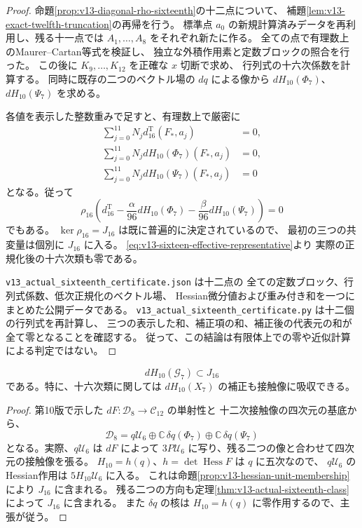 \begin{proof}
命題\ref{prop:v13-diagonal-rho-sixteenth}の十二点について、
補題\ref{lem:v13-exact-twelfth-truncation}の再帰を行う。
標準点 $a_0$ の新規計算済みデータを再利用し、残る十一点では
$A_1,\ldots,A_8$ をそれぞれ新たに作る。
全ての点で有理数上のMaurer--Cartan等式を検証し、
独立な外積作用素と定数ブロックの照合を行った。
この後に $K_9,\ldots,K_{12}$ を正確な $x$ 切断で求め、
行列式の十六次係数を計算する。
同時に既存の二つのベクトル場の $dq$ による像から
$dH_{10}(\Phi_7)$、$dH_{10}(\Psi_7)$ を求める。

各値を表示した整数重みで足すと、有理数上で厳密に
\begin{align*}
 \sum_{j=0}^{11}N_jd^{\mathrm T}_{16}(F_*,a_j)&=0,\\
 \sum_{j=0}^{11}N_jdH_{10}(\Phi_7)(F_*,a_j)&=0,\\
 \sum_{j=0}^{11}N_jdH_{10}(\Psi_7)(F_*,a_j)&=0
\end{align*}
となる。従って
\[
 \rho_{16}\left(
 d^{\mathrm T}_{16}-\frac{\alpha}{96}dH_{10}(\Phi_7)
                   -\frac{\beta}{96}dH_{10}(\Psi_7)\right)=0
\]
でもある。
$\ker\rho_{16}=J_{16}$ は既に普遍的に決定されているので、
最初の三つの共変量は個別に $J_{16}$ に入る。
\eqref{eq:v13-sixteen-effective-representative}より
実際の正規化後の十六次類も零である。

\texttt{v13\_actual\_sixteenth\_certificate.json} は十二点の
全ての定数ブロック、行列式係数、低次正規化のベクトル場、
Hessian微分値および重み付き和を一つにまとめた公開データである。
\texttt{v13\_actual\_sixteenth\_certificate.py} は十二個の行列式を再計算し、
三つの表示した和、補正項の和、補正後の代表元の和が全て零となることを確認する。
従って、この結論は有限体上での零や近似計算による判定ではない。
\end{proof}

\begin{corollary}[七次座標変更のHessian作用も接触像に含まれる]
\label{cor:v13-seventh-Hessian-in-image}
\[
 dH_{10}(\mathcal G_7)\subset J_{16}
\]
である。特に、十六次類に関しては
$dH_{10}(X_7)$ の補正も接触像に吸収できる。
\end{corollary}
\begin{proof}
第10版で示した $dF:\mathcal D_8\to\mathcal C_{12}$ の単射性と
十二次接触像の四次元の基底から、
\[
 \mathcal D_8
 =q\mathcal U_6\oplus
       \mathbb C\,\delta q(\Phi_7)\oplus
       \mathbb C\,\delta q(\Psi_7)
\]
となる。実際、$q\mathcal U_6$ は $dF$ によって
$3P\mathcal U_6$ に写り、残る二つの像と合わせて四次元の接触像を張る。
$H_{10}=h(q)$、$h=\det\operatorname{Hess}F$ は $q$ に五次なので、
$q\mathcal U_6$ のHessian作用は $5H_{10}\mathcal U_6$ に入る。
これは命題\ref{prop:v13-hessian-unit-membership}により $J_{16}$ に含まれる。
残る二つの方向も定理\ref{thm:v13-actual-sixteenth-class}によって
$J_{16}$ に含まれる。
また $\delta q$ の核は $H_{10}=h(q)$ に零作用するので、主張が従う。
\end{proof}

